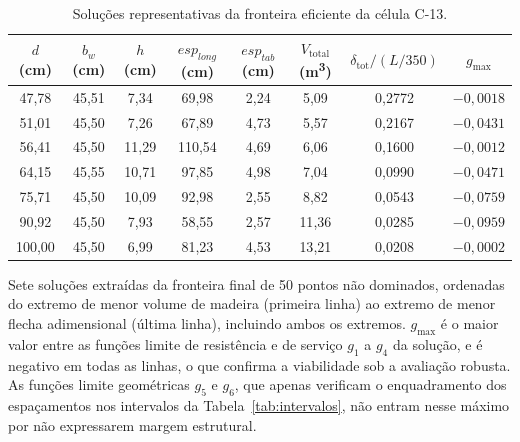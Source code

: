 \begin{table}[!ht]
\caption{Soluções representativas da fronteira eficiente da célula C-13.\label{tab:solucoes_ref}}
\begin{threeparttable}
\setlength{\tabcolsep}{3pt}
\begin{tabular*}{\textwidth}{@{\extracolsep{\fill}}cccccccc@{\extracolsep{\fill}}}
\toprule
$d$ (cm) & $b_w$ (cm) & $h$ (cm) & $esp_{long}$ (cm) & $esp_{tab}$ (cm) & $V_{\mathrm{total}}$ (m\textsuperscript{3}) & $\delta_{\mathrm{tot}}/(L/350)$ & $g_{\max}$ \\
\midrule
47{,}78 & 45{,}51 & 7{,}34 & 69{,}98 & 2{,}24 & 5{,}09 & 0{,}2772 & $-0{,}0018$ \\
51{,}01 & 45{,}50 & 7{,}26 & 67{,}89 & 4{,}73 & 5{,}57 & 0{,}2167 & $-0{,}0431$ \\
56{,}41 & 45{,}50 & 11{,}29 & 110{,}54 & 4{,}69 & 6{,}06 & 0{,}1600 & $-0{,}0012$ \\
64{,}15 & 45{,}55 & 10{,}71 & 97{,}85 & 4{,}98 & 7{,}04 & 0{,}0990 & $-0{,}0471$ \\
75{,}71 & 45{,}50 & 10{,}09 & 92{,}98 & 2{,}55 & 8{,}82 & 0{,}0543 & $-0{,}0759$ \\
90{,}92 & 45{,}50 & 7{,}93 & 58{,}55 & 2{,}57 & 11{,}36 & 0{,}0285 & $-0{,}0959$ \\
100{,}00 & 45{,}50 & 6{,}99 & 81{,}23 & 4{,}53 & 13{,}21 & 0{,}0208 & $-0{,}0002$ \\
\bottomrule
\end{tabular*}
\begin{tablenotes}
\footnotesize
\item Sete soluções extraídas da fronteira final de 50 pontos não dominados, ordenadas do extremo de menor volume de madeira (primeira linha) ao extremo de menor flecha adimensional (última linha), incluindo ambos os extremos. $g_{\max}$ é o maior valor entre as funções limite de resistência e de serviço $g_1$ a $g_4$ da solução, e é negativo em todas as linhas, o que confirma a viabilidade sob a avaliação robusta.
As funções limite geométricas $g_5$ e $g_6$, que apenas verificam o enquadramento dos espaçamentos nos intervalos da Tabela~\ref{tab:intervalos}, não entram nesse máximo por não expressarem margem estrutural.
\end{tablenotes}
\end{threeparttable}
\end{table}

